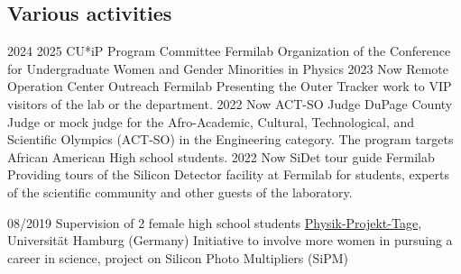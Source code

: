 \subsection{Various activities}
\position
      {2024 \textemdash{} 2025} 
      {CU*iP Program Committee}
      {Fermilab}
      {Organization of the Conference for Undergraduate Women and Gender Minorities in Physics}
\position
      {2023 \textemdash{} Now} 
      {Remote Operation Center Outreach}
      {Fermilab}
      {Presenting the Outer Tracker work to VIP visitors of the lab or the department.}
\position
      {2022 \textemdash{} Now} 
      {ACT-SO Judge}
      {DuPage County}
      {Judge or mock judge for the Afro-Academic, Cultural, Technological, and Scientific Olympics (ACT-SO) in the Engineering category. The program targets African American High school students.}
     \position
      {2022 \textemdash{} Now} 
      {SiDet tour guide}
      {Fermilab}
      {Providing tours of the Silicon Detector facility at Fermilab for students, experts of the scientific community and other guests of the laboratory.}

	\position
      {08/2019} 
      {Supervision of 2 female high school students}
      {\href{https://www.ppt.uni-hamburg.de}{Physik-Projekt-Tage}, Universit\"{a}t Hamburg (Germany)}
      {Initiative to involve more women in pursuing a career in science, project on Silicon Photo Multipliers (SiPM)}

